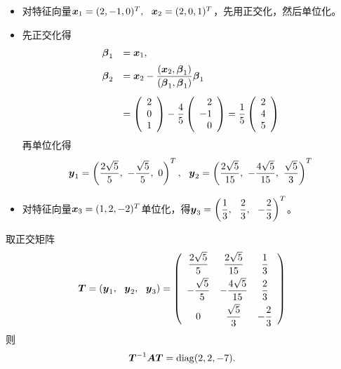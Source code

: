         \begin{frame}
          
          \begin{itemize}
          \item 对特征向量${\boldsymbol{x}}_1=(2,-1,0)^T,~~{\boldsymbol{x}}_2=(2,0,1)^T$，先用正交化，然后单位化。
          \item[] 先正交化得
            $$
            \begin{array}{rl}
              \boldsymbol{\beta}_1&={\boldsymbol{x}}_1,\\[0.2cm]
              \boldsymbol{\beta}_2&\displaystyle ={\boldsymbol{x}}_2-\frac{({\boldsymbol{x}}_2,\boldsymbol{\beta}_1)}{(\boldsymbol{\beta}_1,\boldsymbol{\beta}_1)}\boldsymbol{\beta}_1\\[0.2in]
                       &\displaystyle=\left(
                         \begin{array}{rrr}
                           2\\0\\1
                         \end{array}
              \right)-\frac45\left(
              \begin{array}{rrr}
                2\\-1\\0
              \end{array}
              \right)=\frac15\left(
              \begin{array}{rrr}
                2\\4\\5
              \end{array}
              \right)
            \end{array}
            $$
            \pause
            再单位化得
            $$
            {\boldsymbol{y}}_1=\left(\frac{2\sqrt{5}}{5},~-\frac{\sqrt{5}}{5},~0\right)^T,~~
            {\boldsymbol{y}}_2=\left(\frac{2\sqrt{5}}{15},~-\frac{4\sqrt{5}}{15},~\frac{\sqrt{5}}3\right)^T
            $$


          \item
            对特征向量${\boldsymbol{x}}_3=(1,2,-2)^T$单位化，得$\displaystyle {\boldsymbol{y}}_3=\left(\frac13,~~\frac23,~~-\frac23\right)^T$。
          \end{itemize}
          
        \end{frame}


        \begin{frame}
          
          取正交矩阵
          $$
          \boldsymbol{T}=({\boldsymbol{y}}_1,~~{\boldsymbol{y}}_2,~~{\boldsymbol{y}}_3)=\left(
            \begin{array}{ccc}
              \displaystyle\frac{2\sqrt{5}}{5}&\displaystyle\frac{2\sqrt{5}}{15}&\displaystyle\frac13\\[0.1in]
              \displaystyle-\frac{\sqrt{5}}{5}&\displaystyle-\frac{4\sqrt{5}}{15}&\displaystyle\frac23\\[0.1in]
              0&\displaystyle\frac{\sqrt{5}}3&\displaystyle-\frac23
            \end{array}
          \right)
          $$
          则
          $$
          \boldsymbol{T}^{-1}\boldsymbol{A}\boldsymbol{T}=\mathrm{diag}(2,2,-7).
          $$

          
        \end{frame}


